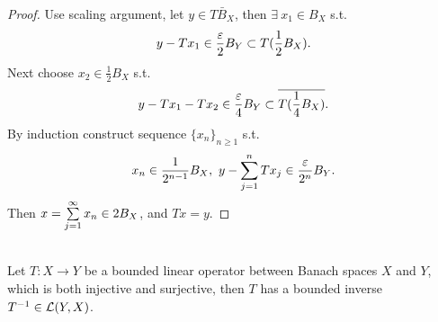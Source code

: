\begin{proof}
\np Use scaling argument, let $y \in \bar{TB_X}$, then $\exists\ x_1 \in B_X$ s.t.
\begin{equation*}
    y - Tx_1 \in  \frac{\varepsilon}{2} B_Y \subset T(\frac{1}{2} B_X).
\end{equation*}
Next choose $x_2 \in \frac{1}{2} B_X$ s.t.
\begin{equation*}
    y - Tx_1 - Tx_2 \in \frac{\varepsilon}{4} B_Y \subset \overline{T(\frac{1}{4}B_X)}.
\end{equation*}
By induction construct sequence $\{x_n\}_{n \geq 1}$ s.t.
\begin{equation*}
    x_n \in \frac{1}{2^{n-1}}B_X,\ y - \sum\limits_{j=1}^{n} Tx_j \in \frac{\varepsilon}{2^n} B_Y.
\end{equation*}
Then $x = \sum\limits_{j=1}^{\infty} x_n \in 2B_X$, and $Tx = y$.
\end{proof}


\vspace{3pt}
\begin{corollary}\ \\
Let $T:X \to Y$ be a bounded linear operator between Banach spaces $X$ and $Y$, which is both injective and surjective, then $T$ has a bounded inverse $T^{-1} \in \mathcal{L}(Y,X)$.
\end{corollary}


